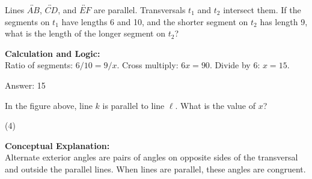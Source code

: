 \documentclass[11pt,paper=a4,answers]{exam}
\begin{document}
\begin{questions}
\question
\begin{center}
\end{center}
Lines $\overleftrightarrow{AB}$, $\overleftrightarrow{CD}$, and $\overleftrightarrow{EF}$ are parallel. Transversals $t_1$ and $t_2$ intersect them. If the segments on $t_1$ have lengths 6 and 10, and the shorter segment on $t_2$ has length 9, what is the length of the longer segment on $t_2$?

\begin{solution}
\textbf{Calculation and Logic:} \\
Ratio of segments: $6 / 10 = 9 / x$. Cross multiply: $6x = 90$. Divide by 6: $x = 15$.

\vspace{30pt}

Answer: \colorbox{yellow!100}{15}
\end{solution}

\vspace{60pt}

\question
\begin{center}
\end{center}
In the figure above, line $k$ is parallel to line $\ell$. What is the value of $x$?
\begin{tasks}(4)
\end{tasks}

\begin{solution}
\textbf{Conceptual Explanation:} \\
Alternate exterior angles are pairs of angles on opposite sides of the transversal and outside the parallel lines. When lines are parallel, these angles are congruent.


\end{solution}
\end{questions}
\end{document}
